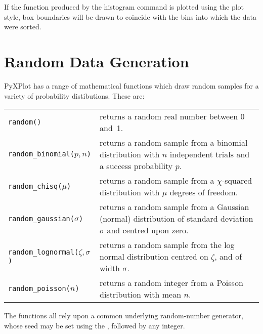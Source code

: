 If the function produced by the histogram command is plotted using the
 plot style, box boundaries will be drawn to coincide with the
bins into which the data were sorted.

\section{Random Data Generation}

PyXPlot has a range of mathematical functions which draw random samples for a
variety of probability distibutions. These are:

\vspace{2mm}
\noindent
\begin{tabular}{lp{7.5cm}}
{\tt random()} & returns a random real number between 0 and~1. \\
{\tt random\_binomial($p,n$)} & returns a random sample from a binomial distribution with $n$ independent trials and a success probability $p$. \\
{\tt random\_chisq($\mu$)} & returns a random sample from a $\chi$-squared distribution with $\mu$ degrees of freedom. \\
{\tt random\_gaussian($\sigma$)} & returns a random sample from a Gaussian (normal) distribution of standard deviation $\sigma$ and centred upon zero. \\
{\tt random\_lognormal($\zeta,\sigma$)} & returns a random sample from the log normal distribution centred on $\zeta$, and of width $\sigma$. \\
{\tt random\_poisson($n$)} & returns a random integer from a Poisson distribution with mean $n$. \\
\end{tabular}
\vspace{2mm}

\noindent The functions all rely upon a common underlying random-number
generator, whose seed may be set using the , followed by any
integer.

